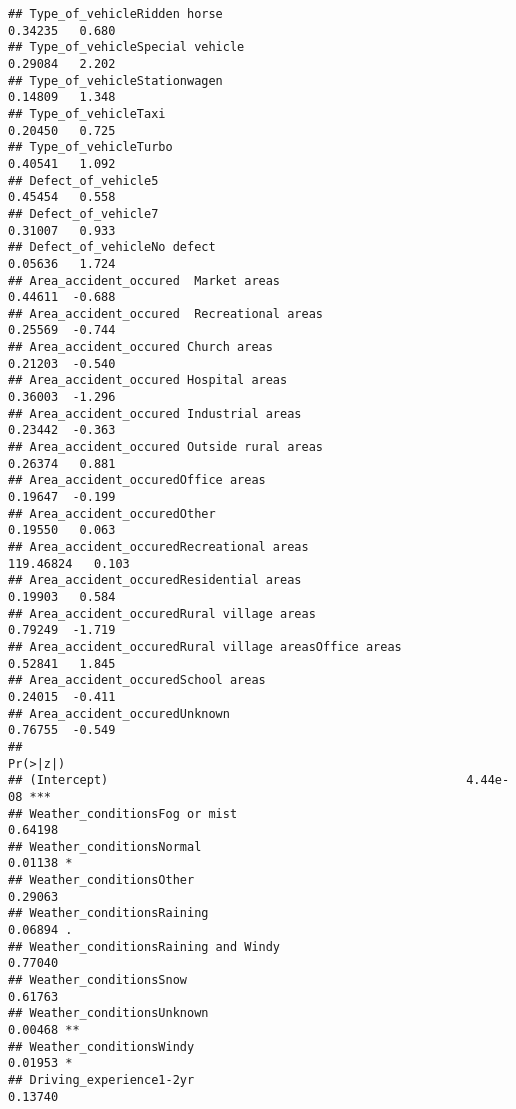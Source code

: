 \documentclass[
]{article}
\begin{document}
\begin{verbatim}
## Type_of_vehicleRidden horse                                     0.34235   0.680
## Type_of_vehicleSpecial vehicle                                  0.29084   2.202
## Type_of_vehicleStationwagen                                     0.14809   1.348
## Type_of_vehicleTaxi                                             0.20450   0.725
## Type_of_vehicleTurbo                                            0.40541   1.092
## Defect_of_vehicle5                                              0.45454   0.558
## Defect_of_vehicle7                                              0.31007   0.933
## Defect_of_vehicleNo defect                                      0.05636   1.724
## Area_accident_occured  Market areas                             0.44611  -0.688
## Area_accident_occured  Recreational areas                       0.25569  -0.744
## Area_accident_occured Church areas                              0.21203  -0.540
## Area_accident_occured Hospital areas                            0.36003  -1.296
## Area_accident_occured Industrial areas                          0.23442  -0.363
## Area_accident_occured Outside rural areas                       0.26374   0.881
## Area_accident_occuredOffice areas                               0.19647  -0.199
## Area_accident_occuredOther                                      0.19550   0.063
## Area_accident_occuredRecreational areas                       119.46824   0.103
## Area_accident_occuredResidential areas                          0.19903   0.584
## Area_accident_occuredRural village areas                        0.79249  -1.719
## Area_accident_occuredRural village areasOffice areas            0.52841   1.845
## Area_accident_occuredSchool areas                               0.24015  -0.411
## Area_accident_occuredUnknown                                    0.76755  -0.549
##                                                              Pr(>|z|)    
## (Intercept)                                                  4.44e-08 ***
## Weather_conditionsFog or mist                                 0.64198    
## Weather_conditionsNormal                                      0.01138 *  
## Weather_conditionsOther                                       0.29063    
## Weather_conditionsRaining                                     0.06894 .  
## Weather_conditionsRaining and Windy                           0.77040    
## Weather_conditionsSnow                                        0.61763    
## Weather_conditionsUnknown                                     0.00468 ** 
## Weather_conditionsWindy                                       0.01953 *  
## Driving_experience1-2yr                                       0.13740    

\end{verbatim}
\end{document}
